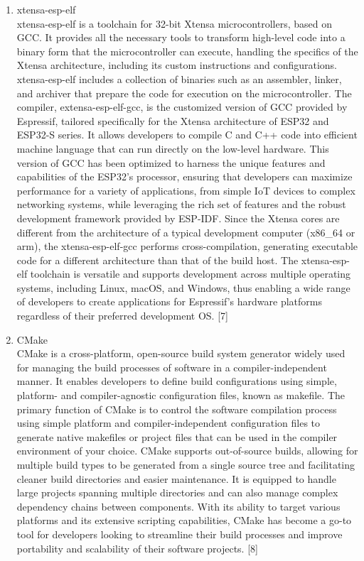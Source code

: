 \documentclass[conference]{IEEEtran}
\begin{document}
\begin{enumerate}[label=\arabic*.]
\begin{enumerate}[label=\alph*.]
\item xtensa-esp-elf\\
xtensa-esp-elf is a toolchain for 32-bit Xtensa microcontrollers, based on GCC. It provides all the necessary tools to transform high-level code into a binary form that the microcontroller can execute, handling the specifics of the Xtensa architecture, including its custom instructions and configurations. xtensa-esp-elf includes a collection of binaries such as an assembler, linker, and archiver that prepare the code for execution on the microcontroller. The compiler, extensa-esp-elf-gcc, is the customized version of GCC provided by Espressif, tailored specifically for the Xtensa architecture of ESP32 and ESP32-S series. It allows developers to compile C and C++ code into efficient machine language that can run directly on the low-level hardware. This version of GCC has been optimized to harness the unique features and capabilities of the ESP32's processor, ensuring that developers can maximize performance for a variety of applications, from simple IoT devices to complex networking systems, while leveraging the rich set of features and the robust development framework provided by ESP-IDF. Since the Xtensa cores are different from the architecture of a typical development computer (x86\_64 or arm), the xtensa-esp-elf-gcc performs cross-compilation, generating executable code for a different architecture than that of the build host. The xtensa-esp-elf toolchain is versatile and supports development across multiple operating systems, including Linux, macOS, and Windows, thus enabling a wide range of developers to create applications for Espressif's hardware platforms regardless of their preferred development OS. [7]\\
\item CMake\\
CMake is a cross-platform, open-source build system generator widely used for managing the build processes of software in a compiler-independent manner. It enables developers to define build configurations using simple, platform- and compiler-agnostic configuration files, known as makefile. The primary function of CMake is to control the software compilation process using simple platform and compiler-independent configuration files to generate native makefiles or project files that can be used in the compiler environment of your choice. CMake supports out-of-source builds, allowing for multiple build types to be generated from a single source tree and facilitating cleaner build directories and easier maintenance. It is equipped to handle large projects spanning multiple directories and can also manage complex dependency chains between components. With its ability to target various platforms and its extensive scripting capabilities, CMake has become a go-to tool for developers looking to streamline their build processes and improve portability and scalability of their software projects. [8]\\

\end{enumerate}
\end{enumerate}
\end{document}
